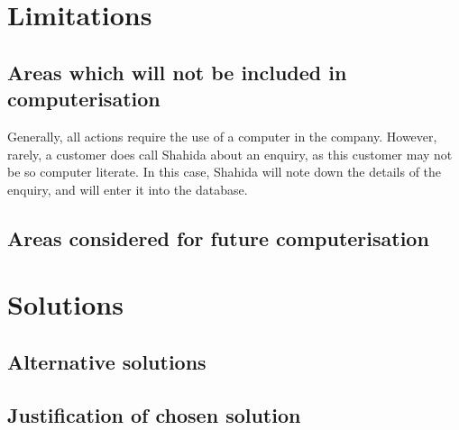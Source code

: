 \section{Limitations}

\subsection{Areas which will not be included in computerisation}
Generally, all actions require the use of a computer in the company. However, rarely, a customer does call Shahida about an enquiry, as this customer may not be so computer literate. In this case, Shahida will note down the details of the enquiry, and will enter it into the database.
\subsection{Areas considered for future computerisation}
%
\section{Solutions}

\subsection{Alternative solutions}
%
\subsection{Justification of chosen solution}
